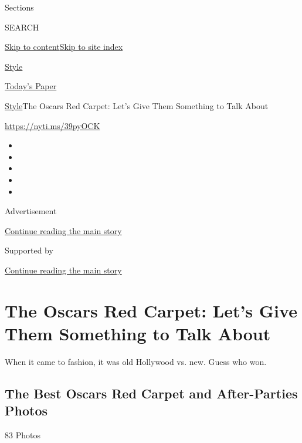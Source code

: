 Sections

SEARCH

\protect\hyperlink{site-content}{Skip to
content}\protect\hyperlink{site-index}{Skip to site index}

\href{https://www.nytimes.com/section/style}{Style}

\href{https://myaccount.nytimes.com/auth/login?response_type=cookie\&client_id=vi}{}

\href{https://www.nytimes.com/section/todayspaper}{Today's Paper}

\href{/section/style}{Style}\textbar{}The Oscars Red Carpet: Let's Give
Them Something to Talk About

\href{https://nyti.ms/39pyOCK}{https://nyti.ms/39pyOCK}

\begin{itemize}
\item
\item
\item
\item
\item
\end{itemize}

Advertisement

\protect\hyperlink{after-top}{Continue reading the main story}

Supported by

\protect\hyperlink{after-sponsor}{Continue reading the main story}

\hypertarget{the-oscars-red-carpet-lets-give-them-something-to-talk-about}{%
\section{The Oscars Red Carpet: Let's Give Them Something to Talk
About}\label{the-oscars-red-carpet-lets-give-them-something-to-talk-about}}

When it came to fashion, it was old Hollywood vs. new. Guess who won.

\href{https://www.nytimes.com/slideshow/2020/02/09/style/oscars-red-carpet-2020.html}{}

\hypertarget{the-best-oscars-red-carpet-and-after-parties-photos}{%
\subsection{The Best Oscars Red Carpet and After-Parties
Photos}\label{the-best-oscars-red-carpet-and-after-parties-photos}}

83 Photos

